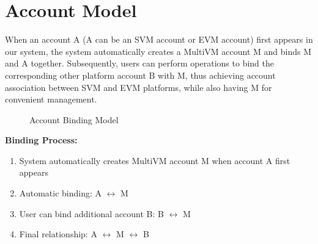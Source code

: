 \documentclass[11pt,a4paper]{article}
\begin{document}
\section{Account Model}

When an account A (A can be an SVM account or EVM account) first appears in our system, the system automatically creates a MultiVM account M and binds M and A together. Subsequently, users can perform operations to bind the corresponding other platform account B with M, thus achieving account association between SVM and EVM platforms, while also having M for convenient management.

\begin{figure}[h]
\centering
{}
\caption{Account Binding Model}
\label{fig:account-model}
\end{figure}

\textbf{Binding Process:}
\begin{enumerate}
    \item System automatically creates MultiVM account M when account A first appears
    \item Automatic binding: A $\leftrightarrow$ M
    \item User can bind additional account B: B $\leftrightarrow$ M
    \item Final relationship: A $\leftrightarrow$ M $\leftrightarrow$ B
\end{enumerate}
\end{document}
